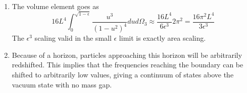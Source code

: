 \documentclass[11pt, class=article, crop=false]{standalone}
\begin{document}
\begin{enumerate}
	To get $\Delta \theta$, we integrate this, giving
	\[
		\Delta \theta = 2 \arctan \frac{\cosh \rho\, \sqrt{2} \sinh \rho_0}{\sqrt{\cosh 2 \rho - \cosh 2 \rho_0}} + c_0
	\]
	The factor of $2$ comes from the fact that we need to do the $\rho$ integration twice to get the full geodesic curve. Now we must take $\rho \to \infty$ to approach the boundary of AdS. In this case, the equation for $\Delta \theta$ simplifies to:
	\[
		\tan \frac{\Delta \theta - c}{2}  = \sinh \rho_0
	\]
	Taking $\theta \to 0$ (corresponding to $\rho_0 \to \infty$) shows that $c = -\pi /2$. This gives
	\[
		\tan \frac{\Delta \theta }{2}  = \frac{1}{\sinh \rho_0}
	\]
	The total length of the trajectory is:
	\[
		L \int d\rho \sqrt{1 + \sinh^2 \rho
		\, (\theta'(\rho))^2} = L \int d\rho \frac{\sinh \rho}{\sqrt{\sinh^2 \rho - \sinh^2 \rho_0}} = 2 L  \log\left(\frac{\cosh \rho_f}{\cosh \rho_0}  +  \sqrt{\frac{\sinh^2 \rho_f - \sinh^2 \rho_0}{\cosh^2 \rho_0}}\right)
	\]
	Take $\rho_f \to \infty$. The leading behavior of this goes as
	\[
		2 L \log \frac{e^{\rho_f}}{\cosh \rho_0} = 2 L \log \left(e^{\rho_f} \sin \frac{\theta}{2} \right)
	\]
	Now note that for $x, y$ coordinates in $\RR^{d+2}$ lying on the unit $S^{d+1}$, we have 
	\[
		|x-y|^2 = (\cos \theta - 1)^2 + \sin^2 \theta = 4 \sin^2 \frac{\theta}{2} \Rightarrow |x-y| = 2 \sin \frac{\theta}{2}.
	\]
	Finally, $\sinh \rho_f = \tan \theta_f$. This gives $\theta_f = \pi/2 - \epsilon$, with $\epsilon = e^{-\rho_f}$. Then $\tilde u = \tan \frac{\theta_f}{2} \approx 1-\epsilon$. So indeed we get the final entropy formula:
	\[
		A = 2 L \log (|x_1-x_2|/\epsilon)
	\]
	
	\item The volume element goes as
	\[
		16 L^4 \int_0^{\sqrt{1-\epsilon}} \frac{u^3}{(1-u^2)^4} du d\Omega_3 \approx \frac{16 L^4}{6 \epsilon^3} 2 \pi^2 = \frac{16 \pi^2 L^4}{3 \epsilon^3}
	\]
	The $\epsilon^3$ scaling valid in the small $\epsilon$ limit is exactly area scaling.
	
	\item Because of a horizon, particles approaching this horizon will be arbitrarily redshifted. This implies that the frequencies reaching the boundary can be shifted to arbitrarily low values, giving a continuum of states above the vacuum state with no mass gap.
	

\end{enumerate}
\end{document}
